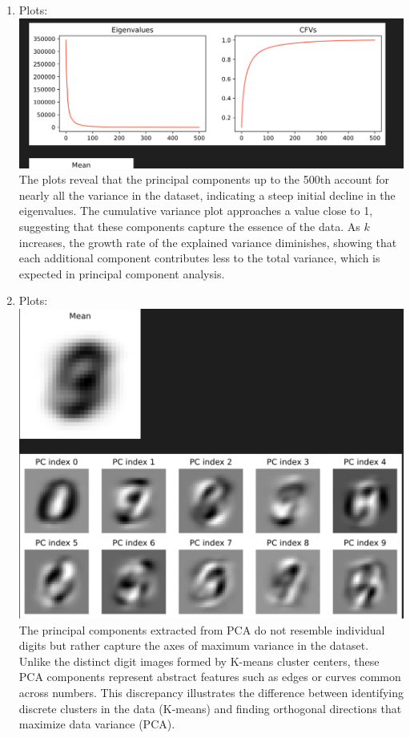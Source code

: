 \documentclass[submit]{harvardml}
\begin{document}
\begin{enumerate}
  \item Plots: \includegraphics[width=0.5\linewidth]{hw5/6.png} The plots reveal that the principal components up to the 500th account for nearly all the variance in the dataset, indicating a steep initial decline in the eigenvalues. The cumulative variance plot approaches a value close to 1, suggesting that these components capture the essence of the data. As $k$ increases, the growth rate of the explained variance diminishes, showing that each additional component contributes less to the total variance, which is expected in principal component analysis.
  \item Plots: \includegraphics[width=0.5\linewidth]{hw5/7.png} The principal components extracted from PCA do not resemble individual digits but rather capture the axes of maximum variance in the dataset. Unlike the distinct digit images formed by K-means cluster centers, these PCA components represent abstract features such as edges or curves common across numbers. This discrepancy illustrates the difference between identifying discrete clusters in the data (K-means) and finding orthogonal directions that maximize data variance (PCA).


\end{enumerate}
\end{document}
